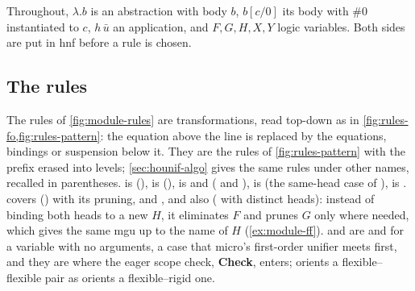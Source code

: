 Throughout, $\lambda.b$ is an abstraction with body $b$, $b[c/0]$ its body with \#0 instantiated to $c$,
$h\,\bar u$ an application, and $F,G,H,X,Y$ logic variables. Both sides are put in hnf before a rule is
chosen.

\subsection{The rules}

The rules of \cref{fig:module-rules} are transformations, read top-down as in \cref{fig:rules-fo,fig:rules-pattern}: the equation above the
line is replaced by the equations, bindings or suspension below it. They are the rules of \cref{fig:rules-pattern}
with the prefix erased into levels; \cref{sec:hounif-algo} gives the same rules under other names, recalled
in parentheses.  is  (),  is 
(),  is  and  ( and
),  is  (the same-head case of ),
 is .  covers  () with its pruning,
 and , and also  ( with distinct heads): instead of binding both heads to a new $H$,
it eliminates $F$ and prunes $G$ only where needed, which gives the same mgu up to the name of $H$
(\cref{ex:module-ff}).  and  are  and  for a
variable with no arguments, a case that micro's first-order unifier meets first, and they are where the
eager scope check, \textbf{Check}, enters;  orients a flexible–flexible pair as
 orients a flexible–rigid one.

